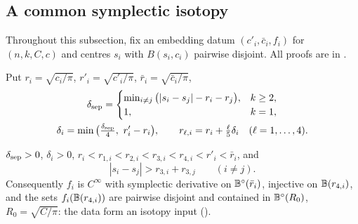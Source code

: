 \subsection{A common symplectic isotopy}\label{sec:ham-isotopy}

Throughout this subsection, fix an embedding datum $(c'_i,\bar c_i,f_i)$ for $(n,k,C,c)$ and centres $s_i$ with $B(s_i,c_i)$ pairwise disjoint. All proofs are in .

\begin{definition}[Radii]\label{def:ham-radii}
Put $r_i=\sqrt{c_i/\pi}$, $r'_i=\sqrt{c'_i/\pi}$, $\bar r_i=\sqrt{\bar c_i/\pi}$,
\[
\begin{gathered}
 \delta_{\rm sep}=\begin{cases}\min_{i\ne j}\big(|s_i-s_j|-r_i-r_j\big),&k\ge2,\\ 1,&k=1,\end{cases}\\
 \delta_i=\min\big(\tfrac{\delta_{\rm sep}}4,\ r'_i-r_i\big),\qquad r_{\ell,i}=r_i+\tfrac{\ell}{5}\delta_i\quad(\ell=1,\dots,4).
\end{gathered}
\]
\end{definition}

\begin{lemma}[Radii]\label{lem:ham-radii}
$\delta_{\rm sep}>0$, $\delta_i>0$, $r_i<r_{1,i}<r_{2,i}<r_{3,i}<r_{4,i}<r'_i<\bar r_i$, and
\begin{equation}\label{eq:ham-start-sep}
 |s_i-s_j|>r_{3,i}+r_{3,j}\qquad(i\ne j).
\end{equation}
Consequently $f_i$ is $C^\infty$ with symplectic derivative on $\mathbb{B}^\circ(\bar r_i)$, injective on $\mathbb{B}(r_{4,i})$, and the sets
$f_i(\mathbb{B}(r_{4,i}))$ are pairwise disjoint and contained in $\mathbb{B}^\circ(R_0)$, $R_0=\sqrt{C/\pi}$: the data form an isotopy
input ().
\end{lemma}

